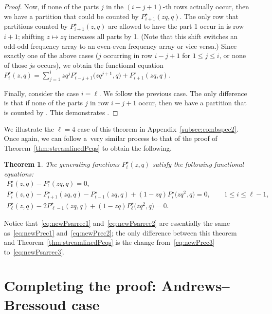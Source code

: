 \documentclass[10pt,a4paper]{amsart}
\numberwithin{equation}{section}
\newtheorem{Theorem}{Theorem}[section]
\theoremstyle{definition}
\begin{document}
\begin{proof}
Now, if none of the parts $j$ in the $(i-j+1)$-th rows actually occur, then we have a partition that could be counted by $P^\star_{i+1}(zq,q)$. The only row that partitions counted by $P^\star_{i+1}(z,q)$ are allowed to have the part 1 occur in is row $i+1$; shifting $z\mapsto zq$ increases all parts by 1. (Note that this shift switches an odd-odd frequency array to an even-even frequency array or vice versa.) Since exactly one of the above cases ($j$ occurring in row $i-j+1$ for $1 \le j \le i$, or none of those $j$s occurs), we obtain the functional equation $P^\star_i(z,q) = \sum_{j=1}^i zq^j P^\star_{i-j+1}\bigl(zq^{j+1},q\bigr)+ P^\star_{i+1}(zq,q)$.

Finally, consider the case $i=\ell$. We follow the previous case. The only difference is that if none of the parts $j$ in row $i-j+1$ occur, then we have a partition that is counted by . This demonstrates .
\end{proof}

We illustrate the $\ell=4$ case of this theorem in Appendix~\ref{subsec:combspec2}. Once again, we can follow a~very similar process to that of the proof of Theorem~\ref{thm:streamlinedPeqs} to obtain the following.
\begin{Theorem}
The generating functions $P^\star_i(z,q)$ satisfy the following functional equations:
\begin{gather}
P^\star_0(z,q)-P^\star_1(zq,q) =0,\label{eq:newPsarrec1} \\
P^\star_i(z,q) - P^\star_{i+1}(zq,q) - P^\star_{i-1}(zq,q) + (1-zq)P^\star_{i}\bigl(zq^2,q\bigr) =0, \qquad 1 \le i \le \ell-1, \label{eq:newPsarrec2} \\
P^\star_\ell(z,q) - 2P^\star_{\ell-1}(zq,q) + (1-zq) P^\star_{\ell}\bigl(zq^2,q\bigr) = 0.\label{eq:newPsarrec3}
\end{gather}
\end{Theorem}
Notice that~\eqref{eq:newPsarrec1} and~\eqref{eq:newPsarrec2} are essentially the same as~\eqref{eq:newPrec1} and~\eqref{eq:newPrec2}; the only difference between this theorem and Theorem~\ref{thm:streamlinedPeqs} is the change from~\eqref{eq:newPrec3} to~\eqref{eq:newPsarrec3}.

\section{Completing the proof: Andrews--Bressoud case}\label{sec:comp5}
\end{document}
